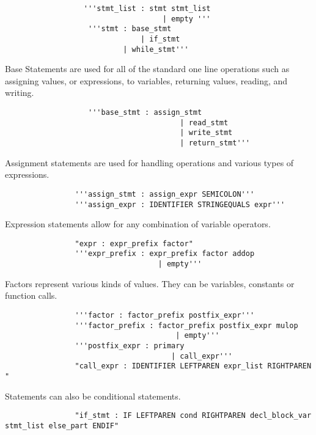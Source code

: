 \documentclass[12pt]{article}
\begin{document}
            \begin{verbatim}
                  '''stmt_list : stmt stmt_list
				                    | empty '''
				   '''stmt : base_stmt
             				   | if_stmt
		               	   | while_stmt'''
           \end{verbatim}
           
           Base Statements are used for all of the standard one line operations such as assigning values, or expressions, to variables, returning values, reading, and writing.
           \begin{verbatim}
                   '''base_stmt : assign_stmt
					                    | read_stmt
					                    | write_stmt
					                    | return_stmt'''
           \end{verbatim}
           
           Assignment statements are used for handling operations and various types of expressions.
           
           \begin{verbatim}
           		'''assign_stmt : assign_expr SEMICOLON'''
           		'''assign_expr : IDENTIFIER STRINGEQUALS expr'''
            \end{verbatim}		
           
			Expression statements allow for any combination of variable operators.  
			
			\begin{verbatim}
				"expr : expr_prefix factor"      
				'''expr_prefix : expr_prefix factor addop
                                   | empty'''
			\end{verbatim}	   
			
			Factors represent various kinds of values.  They can be variables, constants or function calls.
			
			\begin{verbatim}
				'''factor : factor_prefix postfix_expr'''
				'''factor_prefix : factor_prefix postfix_expr mulop
				                       | empty'''
				'''postfix_expr : primary
			                          | call_expr'''  
			    "call_expr : IDENTIFIER LEFTPAREN expr_list RIGHTPAREN "                                          
			\end{verbatim}	
			
			Statements can also be conditional statements.
			\begin{verbatim}
				"if_stmt : IF LEFTPAREN cond RIGHTPAREN decl_block_var stmt_list else_part ENDIF"
           \end{verbatim}	
           
\end{document}
